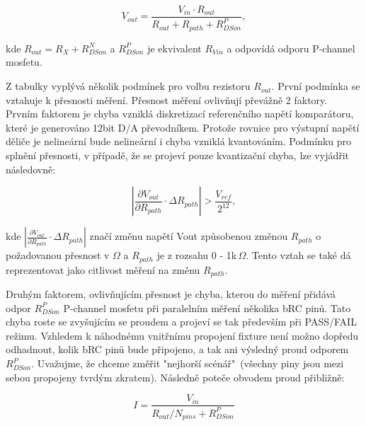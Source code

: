 \begin{equation}
V_{out} = \frac{ V_{in}\cdot R_{out} }  {R_{out} + R_{path} + R^P_{DSon}},
\end{equation}

kde ${R_{out}} = R_X + R^N_{DSon}$ a $R^P_{DSon}$ je ekvivalent $R_{Vin}$ a odpovídá odporu P-channel mosfetu.\par

Z tabulky vyplývá několik podmínek pro volbu rezistoru ${R_{out}}$. První podmínka se vztahuje k přesnosti měření.
Přesnost měření ovlivňují převážně 2 faktory.
Prvním faktorem je chyba vzniklá diskretizací referenčního napětí komparátoru,
které je generováno 12bit D/A převodníkem. Protože rovnice pro výstupní napětí děliče je nelineární
bude nelineární i chyba vzniklá kvantováním.
Podmínku pro splnění přesnosti, v případě, že se projeví pouze kvantizační chyba, lze vyjádřit následovně:

\begin{equation}
\left| \frac{\partial V_{out} }{\partial R_{path}}\cdot \Delta R_{path} \right| > \frac{V_{ref}}{2^{12}},
\end{equation}

kde $\left| \frac{\partial V_{out} }{\partial R_{path}}\cdot \Delta R_{path} \right|$
značí změnu napětí Vout způsobenou změnou $R_{path}$ o
požadovanou přesnost v $\Omega$ a $R_{path}$ je z rozsahu 0 - 1k\,$\Omega$.
Tento vztah se také dá reprezentovat jako citlivost měření na změnu $R_{path}$.\par

Druhým faktorem, ovlivňujícím přesnost je chyba,
kterou do měření přidává odpor $R^P_{DSon}$ P-channel mosfetu při paralelním měření několika bRC pinů.
Tato chyba roste se zvyšujícím se proudem a projeví se tak především při PASS/FAIL režimu.
Vzhledem k náhodnému vnitřnímu propojení fixture není možno dopředu odhadnout,
kolik bRC pinů bude připojeno, a tak ani výsledný proud odporem $R^P_{DSon}$.
Uvažujme, že chceme změřit "nejhorší scénář"\ (všechny piny jsou mezi sebou propojeny tvrdým zkratem).
Následně poteče obvodem proud přibližně:

\begin{equation}
I = \frac{V_{in}}{R_{out}/N_{pins} + R^P_{DSon}}
\end{equation}

